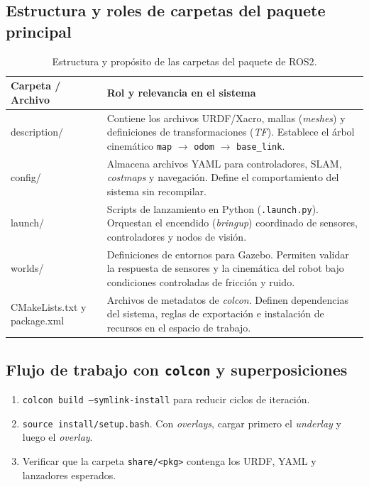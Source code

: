 \subsection{Estructura y roles de carpetas del paquete principal}
\begin{table}[H]
\centering
\small
\caption{Estructura y propósito de las carpetas del paquete de \gls{ROS2}.}
\label{tab:ws_roles}
\begin{tabular}{>{\ttfamily}P{0.27\textwidth} P{0.65\textwidth}}
    \toprule
    \textbf{Carpeta / Archivo} & \textbf{Rol y relevancia en el sistema} \\ 
    \midrule
    description/ & Contiene los archivos URDF/Xacro, mallas (\textit{meshes}) y definiciones de transformaciones (\textit{TF}). Establece el árbol cinemático \texttt{map} $\rightarrow$ \texttt{odom} $\rightarrow$ \texttt{base\_link}. \\ \addlinespace
    config/      & Almacena archivos YAML para controladores, SLAM, \textit{costmaps} y navegación. Define el comportamiento del sistema sin recompilar. \\ \addlinespace
    launch/      & Scripts de lanzamiento en Python (\texttt{.launch.py}). Orquestan el encendido (\textit{bringup}) coordinado de sensores, controladores y nodos de visión. \\ \addlinespace
    worlds/      & Definiciones de entornos para Gazebo. Permiten validar la respuesta de sensores y la cinemática del robot bajo condiciones controladas de fricción y ruido. \\ \addlinespace
    CMakeLists.txt y package.xml & Archivos de metadatos de \textit{colcon}. Definen dependencias del sistema, reglas de exportación e instalación de recursos en el espacio de trabajo. \\ 
    \bottomrule
\end{tabular}
\end{table}

\subsection{Flujo de trabajo con \texttt{colcon} y superposiciones}
\begin{enumerate}
  \item \texttt{colcon build --symlink-install} para reducir ciclos de iteración.
  \item \texttt{source install/setup.bash}. Con \emph{overlays}, cargar primero el \emph{underlay} y luego el \emph{overlay}.
  \item Verificar que la carpeta \texttt{share/<pkg>} contenga los URDF, YAML y lanzadores esperados.
\end{enumerate}

